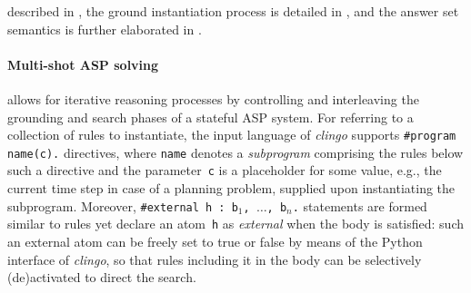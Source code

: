 \documentclass{tlp} %
\newcommand{\clingo}{\emph{clingo}\xspace}
\begin{document}
described in \citep{cafageiakakrlemarisc20a,gehakalisc15a},
the ground instantiation process is detailed in \citep{kamsch21a},
and the answer set semantics is further elaborated in \citep{gehakalisc15a,lifschitz19a}.
%

\paragraph{Multi-shot ASP solving} \citep{gekakasc17a}
allows for iterative reasoning processes by controlling and interleaving
the grounding and search phases of a stateful ASP system.
For referring to a collection of rules to instantiate,
the input language of \clingo supports \lstinline{#program name(c).}
directives, where \lstinline{name} denotes a \emph{subprogram} comprising
the rules below such a directive and the parameter~\lstinline{c} is a
placeholder for some value, e.g., the current time step in case of a
planning problem, supplied upon instantiating the subprogram.
Moreover, \lstinline{#external h : b}$_1$\lstinline{, }$\dots$\lstinline{, b}$_n$\lstinline{.}
statements are formed similar to rules yet declare an atom~\lstinline{h} as
\emph{external} when the body is satisfied:
such an external atom can be freely set to true or false by means of the
Python interface of \clingo,
so that rules including it in the body can be selectively (de)activated
to direct the search.
%
\end{document}
